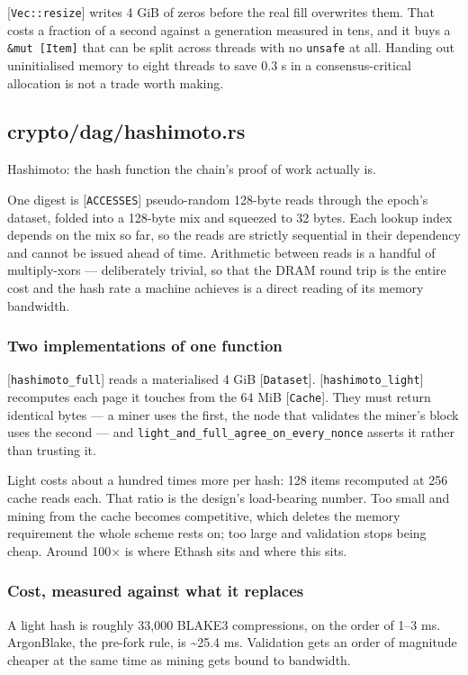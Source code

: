 \documentclass[11pt,a4paper]{article}
\begin{document}
[\texttt{Vec::resize}] writes 4 GiB of zeros before the real fill overwrites them.
That costs a fraction of a second against a generation measured in tens, and
it buys a \texttt{\&mut [Item]} that can be split across threads with no \texttt{unsafe} at
all. Handing out uninitialised memory to eight threads to save 0.3 s in a
consensus-critical allocation is not a trade worth making.

\subsection{crypto/dag/hashimoto.rs}
Hashimoto: the hash function the chain's proof of work actually is.

One digest is [\texttt{ACCESSES}] pseudo-random 128-byte reads through the epoch's
dataset, folded into a 128-byte mix and squeezed to 32 bytes. Each lookup
index depends on the mix so far, so the reads are strictly sequential in
their dependency and cannot be issued ahead of time. Arithmetic between
reads is a handful of multiply-xors — deliberately trivial, so that the DRAM
round trip is the entire cost and the hash rate a machine achieves is a
direct reading of its memory bandwidth.

\subsubsection{Two implementations of one function}

[\texttt{hashimoto\_full}] reads a materialised 4 GiB [\texttt{Dataset}]. [\texttt{hashimoto\_light}]
recomputes each page it touches from the 64 MiB [\texttt{Cache}]. They must return
identical bytes — a miner uses the first, the node that validates the miner's
block uses the second — and \texttt{light\_and\_full\_agree\_on\_every\_nonce} asserts it
rather than trusting it.

Light costs about a hundred times more per hash: 128 items recomputed at 256
cache reads each. That ratio is the design's load-bearing number. Too small
and mining from the cache becomes competitive, which deletes the memory
requirement the whole scheme rests on; too large and validation stops being
cheap. Around 100× is where Ethash sits and where this sits.

\subsubsection{Cost, measured against what it replaces}

A light hash is roughly 33,000 BLAKE3 compressions, on the order of 1–3 ms.
ArgonBlake, the pre-fork rule, is \textasciitilde{}25.4 ms. Validation gets an order of
magnitude cheaper at the same time as mining gets bound to bandwidth.
\end{document}
